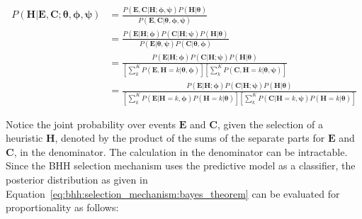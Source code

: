 \footnotesize
\begin{equation}
      \label{eq:bhh:selection_mechanism:predictive_model}
      \begin{split}
            P(\boldsymbol{H} \vert \boldsymbol{E}, \boldsymbol{C};  \boldsymbol{\theta}, \boldsymbol{\phi}, \boldsymbol{\psi})
            &= \frac{
                  P(\boldsymbol{E}, \boldsymbol{C} \vert \boldsymbol{H};  \boldsymbol{\phi}, \boldsymbol{\psi})  P(\boldsymbol{H} \vert \boldsymbol{\theta})
            }{
                  P(\boldsymbol{E}, \boldsymbol{C} \vert \boldsymbol{\theta}, \boldsymbol{\phi}, \boldsymbol{\psi})
            } \\
            &= \frac{
                  P(\boldsymbol{E} \vert \boldsymbol{H};  \boldsymbol{\phi})  P(\boldsymbol{C} \vert \boldsymbol{H};  \boldsymbol{\psi}) P(\boldsymbol{H} \vert \boldsymbol{\theta})
            }{
                  P(\boldsymbol{E} \vert \boldsymbol{\theta}, \boldsymbol{\psi}) P(\boldsymbol{C} \vert \boldsymbol{\theta}, \boldsymbol{\phi})
            } \\
            &= \frac{
                  P(\boldsymbol{E} \vert \boldsymbol{H};  \boldsymbol{\phi})  P(\boldsymbol{C} \vert \boldsymbol{H};  \boldsymbol{\psi}) P(\boldsymbol{H} \vert \boldsymbol{\theta})
            }{
                  \left[ \sum_{k}^{K} P(\boldsymbol{E}, \boldsymbol{H}=k \vert \boldsymbol{\theta}, \boldsymbol{\phi}) \right] \left[ \sum_{k}^{K}  P(\boldsymbol{C}, \boldsymbol{H}=k \vert \boldsymbol{\theta}, \boldsymbol{\psi}) \right]
            } \\
            &= \frac{
                  P(\boldsymbol{E} \vert \boldsymbol{H};  \boldsymbol{\phi})  P(\boldsymbol{C} \vert \boldsymbol{H};  \boldsymbol{\psi}) P(\boldsymbol{H} \vert \boldsymbol{\theta})
            }{
                  \left[ \sum_{k}^{K} P(\boldsymbol{E} \vert \boldsymbol{H}=k, \boldsymbol{\phi}) P(\boldsymbol{H}=k \vert \boldsymbol{\theta}) \right] \left[ \sum_{k}^{K} P(\boldsymbol{C} \vert \boldsymbol{H}=k, \boldsymbol{\psi}) P(\boldsymbol{H}=k \vert \boldsymbol{\theta}) \right]
            }
      \end{split}
\end{equation}
\normalsize

Notice the joint probability over events $\boldsymbol{E}$ and $\boldsymbol{C}$, given the selection of a heuristic $\boldsymbol{H}$, denoted by the product of the sums of the separate parts for $\boldsymbol{E}$ and $\boldsymbol{C}$, in the denominator. The calculation in the denominator can be intractable. Since the \acs{BHH} selection mechanism uses the predictive model as a classifier, the posterior distribution as given in Equation~\eqref{eq:bhh:selection_mechanism:bayes_theorem} can be evaluated for proportionality as follows:

